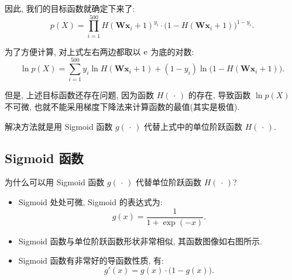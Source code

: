 \begin{frame}{\insertsection}{\insertsubsection}
因此, 我们的目标函数就确定下来了:
\[
  p(X) = \prod_{i = 1}^{500} H(\bm{W}\bm{x}_i + 1)^{y_i}\cdot\big(1 - H(\bm{W}\bm{x}_i + 1)\big)^{1 - y_i}\text{.}
\]

为了方便计算, 对上式左右两边都取以 $\mathrm{e}$ 为底的对数:
\[
  \ln p(X) = \sum_{i = 1}^{500} y_i\ln H(\bm{W}\bm{x}_i + 1) + (1 - y_i)\ln\big(1 - H(\bm{W}\bm{x}_i + 1)\big)\text{.}
\]

但是, 上述目标函数还存在问题, 因为函数 $H(\,\cdot\,)$ 的存在, 导致函数 $\ln p(X)$ 不可微, 也就不能采用梯度下降法来计算函数的最值(其实是极值).

解决方法就是用 Sigmoid 函数 $g(\,\cdot\,)$ 代替上式中的单位阶跃函数 $H(\,\cdot\,)$.
\end{frame}

\subsection{Sigmoid 函数}
\begin{frame}{\insertsection}{\insertsubsection}
为什么可以用 Sigmoid 函数 $g(\,\cdot\,)$ 代替单位阶跃函数 $H(\,\cdot\,)$?

\begin{minipage}[m]{0.48\textwidth}
\begin{itemize}
\item Sigmoid 处处可微, Sigmoid 的表达式为:
\[
  g(x) = \frac{1}{1 + \exp(-x)}\text{.}
\]
\item Sigmoid 函数与单位阶跃函数形状非常相似, 其函数图像如右图所示.
\item Sigmoid 函数有非常好的导函数性质, 有:
\[
  g'(x) = g(x)\cdot\big(1 - g(x)\big)\text{.}
\]
\end{itemize}
\end{minipage}%
\hfill%
\begin{minipage}[m]{0.48\textwidth}
\begin{figure}
  \centering
\end{figure}
\end{minipage}



\end{frame}
